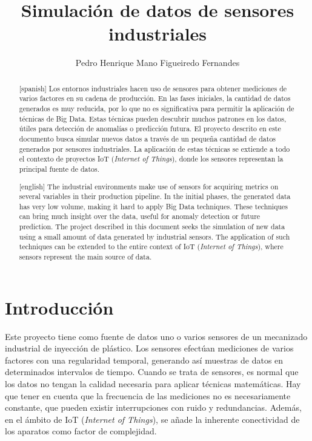 \documentclass[11pt,spanish,listoffigures,listoftables]{tfgetsinf}
\title{Simulación de datos de sensores industriales}
\author{Pedro Henrique Mano Figueiredo Fernandes}
\begin{document}
\begin{abstract}[spanish]
Los entornos industriales hacen uso de sensores para obtener mediciones de varios factores en su cadena de producción. En las fases iniciales, la cantidad de datos generados es muy reducida, por lo que no es significativa para permitir la aplicación de técnicas de Big Data. Estas técnicas pueden descubrir muchos patrones en los datos, útiles para detección de anomalías o predicción futura. El proyecto descrito en este documento busca simular nuevos datos a través de un pequeña cantidad de datos generados por sensores industriales. La aplicación de estas técnicas se extiende a todo el contexto de proyectos IoT ({\em Internet of Things}), donde los sensores representan la principal fuente de datos. 
\end{abstract}

\begin{abstract}[english]
The industrial environments make use of sensors for acquiring metrics on several variables in their production pipeline. In the initial phases, the generated data has very low volume, making it hard to apply Big Data techniques. These techniques can bring much insight over the data, useful for anomaly detection or future prediction. The project described in this document seeks the simulation of new data using a small amount of data generated by industrial sensors. The application of such techniques can be extended to the entire context of IoT ({\em Internet of Things}), where sensors represent the main source of data.
\end{abstract}


\mainmatter

\chapter{Introducción}
Este proyecto tiene como fuente de datos uno o varios sensores de un mecanizado industrial de inyección de plástico. Los sensores efectúan mediciones de varios factores con una regularidad temporal, generando así muestras de datos en determinados intervalos de tiempo. Cuando se trata de sensores, es normal que los datos no tengan la calidad necesaria para aplicar técnicas matemáticas. Hay que tener en cuenta que la frecuencia de las mediciones no es necesariamente constante, que pueden existir interrupciones con ruido y redundancias. Además, en el ámbito de IoT ({\em Internet of Things}), se añade la inherente conectividad de los aparatos como factor de complejidad.
\end{document}
